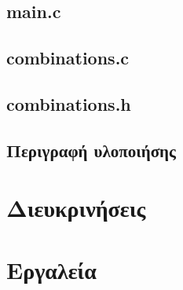 \documentclass{article}
\begin{document}
    \subsection{main.c}



    \subsection{combinations.c}



    \subsection{combinations.h}



    \subsection{Περιγραφή υλοποιήσης}

    

\section{Διευκρινήσεις}



\section{Εργαλεία}
\end{document}
